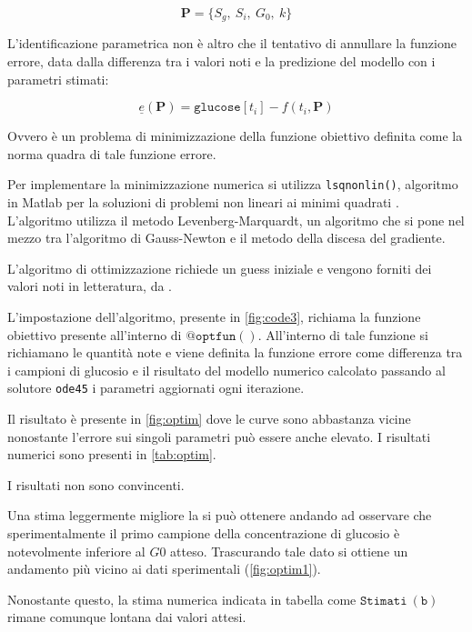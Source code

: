 \begin{equation}
	\mathbf{P}=\{S_g,\:S_i,\:G_0,\:k\}
\end{equation}

L'identificazione parametrica non è altro che il tentativo di annullare la funzione errore, data dalla differenza tra i valori noti e la predizione del modello con i parametri stimati:

\begin{equation}
	\underline{e}\left(\mathbf{P}\right)=\mathtt{glucose}[t_i]-f(t_i,\mathbf{P})
\end{equation}

Ovvero è un problema di minimizzazione della funzione obiettivo definita come la norma quadra di tale funzione errore.

Per implementare la minimizzazione numerica si utilizza \texttt{lsqnonlin()}, algoritmo in Matlab per la soluzioni di problemi non lineari ai minimi quadrati \cite{lsqnonlin}. L'algoritmo utilizza il metodo Levenberg-Marquardt, un algoritmo che si pone nel mezzo tra l'algoritmo di Gauss-Newton e il metodo della discesa del gradiente.

L'algoritmo di ottimizzazione richiede un guess iniziale e vengono forniti dei valori noti in letteratura, da \citeauthor{pacini_minmod_1986} \cite{pacini_minmod_1986}.

L'impostazione dell'algoritmo, presente in \cref{fig:code3}, richiama la funzione obiettivo presente all'interno di $\mathtt{@optfun()}$. All'interno di tale funzione si richiamano le quantità note e viene definita la funzione errore come differenza tra i campioni di glucosio e il risultato del modello numerico calcolato passando al solutore \texttt{ode45} i parametri aggiornati ogni iterazione.

Il risultato è presente in \cref{fig:optim} dove le curve sono abbastanza vicine nonostante l'errore sui singoli parametri può essere anche elevato. I risultati numerici sono presenti in \cref{tab:optim}.

I risultati non sono convincenti.

Una stima leggermente migliore la si può ottenere andando ad osservare che sperimentalmente il primo campione della concentrazione di glucosio è notevolmente inferiore al $G0$ atteso. Trascurando tale dato si ottiene un andamento più vicino ai dati sperimentali (\cref{fig:optim1}). 

Nonostante questo, la stima numerica indicata in tabella come $\mathtt{Stimati \:(b)}$ rimane comunque lontana dai valori attesi.




